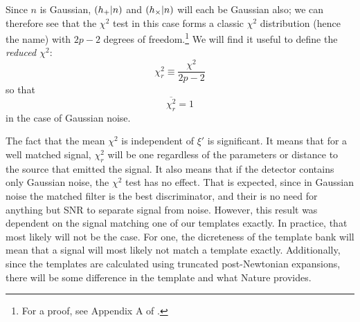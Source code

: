 Since $n$ is Gaussian, $(h_{+}|n)$ and $(h_{\times}|n)$ will each be Gaussian also; we can therefore see that the $\chi^2$ test in this case forms a classic $\chi^2$ distribution (hence the name) with $2p -2$ degrees of freedom.\footnote{For a proof, see Appendix A of \cite{Allen:2004}.} We will find it useful to define the \emph{reduced $\chi^2$}:
\begin{equation}
\label{eqn:reduced_chisq}
\chi^2_{r} \equiv \frac{\chi^2}{2p - 2}
\end{equation}
so that
\begin{equation*}
\overline{\chi^2_{r}} = 1
\end{equation*}
in the case of Gaussian noise.

The fact that the mean $\chi^2$ is independent of $\xi'$ is significant. It means that for a well matched signal, $\chi^2_r$ will be one regardless of the parameters or distance to the source that emitted the signal. It also means that if the detector contains only Gaussian noise, the $\chi^2$ test has no effect. That is expected, since in Gaussian noise the matched filter is the best discriminator, and their is no need for anything but \ac{SNR} to separate signal from noise. However, this result was dependent on the signal matching one of our templates exactly. In practice, that most likely will not be the case. For one, the dicreteness of the template bank will mean that a signal will most likely not match a template exactly. Additionally, since the templates are calculated using truncated post-Newtonian expansions, there will be some difference in the template and what Nature provides.

